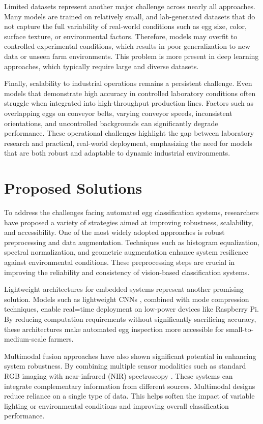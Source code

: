 \documentclass[conference]{IEEEtran}
\begin{document}
	Limited datasets represent another major challenge across nearly all approaches. Many models are trained on relatively small, and lab-generated datasets that do not capture the full variability of real-world conditions such as egg size, color, surface texture, or environmental factors. Therefore, models may overfit to controlled experimental conditions, which results in poor generalization to new data or unseen farm environments. This problem is more present in deep learning approaches, which typically require large and diverse datasets.
	
	Finally, scalability to industrial operations remains a persistent challenge. Even models that demonstrate high accuracy in controlled laboratory conditions often struggle when integrated into high-throughput production lines. Factors such as overlapping eggs on conveyor belts, varying conveyor speeds, inconsistent orientations, and uncontrolled backgrounds can significantly degrade performance. These operational challenges highlight the gap between laboratory research and practical, real-world deployment, emphasizing the need for models that are both robust and adaptable to dynamic industrial environments.

	\section{Proposed Solutions}
	
	To address the challenges facing automated egg classification systems, researchers have proposed a variety of strategies aimed at improving robustness, scalability, and accessibility. One of the most widely adopted approaches is robust preprocessing and data augmentation. Techniques such as histogram equalization, spectral normalization, and geometric augmentation enhance system resilience against environmental conditions. These preprocessing steps are crucial in improving the reliability and consistency of vision-based classification systems.
	
	Lightweight architectures for embedded systems represent another promising solution. Models such as lightweight CNNs \cite{chen2022lightweight}, combined with mode compression techniques, enable real=time deployment on low-power devices like Raspberry Pi. By reducing computation requirements without significantly sacrificing accuracy, these architectures make automated egg inspection more accessible for small-to-medium-scale farmers.
	
	Multimodal fusion approaches have also shown significant potential in enhancing system robustness. By combining multiple sensor modalities such as standard RGB imaging with near-infrared (NIR) spectroscopy \cite{garcia2024fusion}. These systems can integrate complementary information from different sources. Multimodal designs reduce reliance on a single type of data. This helps soften the impact of variable lighting or environmental conditions and improving overall classification performance.
	
\end{document}
